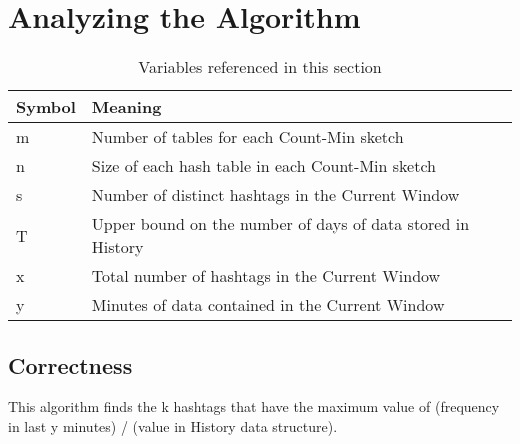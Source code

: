 \documentclass[twoside]{article}
\begin{document}

\section{Analyzing the Algorithm}

\begin{table}[h]
\centering
\begin{tabular}{@{}ll@{}}
\toprule
Symbol & Meaning                                                           \\ \midrule
m      & Number of tables for each Count-Min sketch                        \\
n      & Size of each hash table in each Count-Min sketch                  \\
s      & Number of distinct hashtags in the Current Window                 \\
T      & Upper bound on the number of days of data stored in History \\
x      & Total number of hashtags in the Current Window                   \\
y      & Minutes of data contained in the Current Window                   \\ \bottomrule
\end{tabular}
\caption{Variables referenced in this section}
\end{table}

\subsection{Correctness} \label{sec:Correctness}

This algorithm finds the k hashtags that have the maximum value of (frequency in last y minutes) / (value in History data structure).
\end{document}
